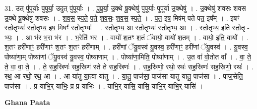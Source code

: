 \documentclass[17pt]{extarticle}
\begin{document}
31. उत् पु॑पूर्याः पुपूर्या॒ उदुत् पु॑पूर्याः । . पु॒पू॒र्या॒ उ॒क्थे षू॒क्थेषु॑ पुपूर्याः पुपूर्या उ॒क्थेषु॑ । . उ॒क्थेषु॑ शवसः शवस उ॒क्थे षू॒क्थेषु॑ शवसः । . श॒व॒स॒ स्प॒ते॒ प॒ते॒ श॒व॒सः॒ श॒व॒स॒ स्प॒ते॒ । . प॒त॒ इष॒ मिष॑म् पते पत॒ इष᳚म् । . इषꣳ॑ स्तो॒तृभ्यः॑ स्तो॒तृभ्य॒ इष॒ मिषꣳ॑ स्तो॒तृभ्यः॑ । . स्तो॒तृभ्य॒ आ स्तो॒तृभ्यः॑ स्तो॒तृभ्य॒ आ । . स्तो॒तृभ्य॒ इति॑ स्तो॒तृ - भ्यः॒ । . आ भ॑र भ॒रा भ॑र । . भ॒रेति॑ भर । . वायो॑ श॒तꣳ श॒तं ॅवायो॒ वायो॑ श॒तम् । . वायो॒ इति॒ वायो᳚ । . श॒तꣳ हरी॑णाꣳ॒॒ हरी॑णाꣳ श॒तꣳ श॒तꣳ हरी॑णाम् । . हरी॑णां ॅयु॒वस्व॑ यु॒वस्व॒ हरी॑णाꣳ॒॒ हरी॑णां ॅयु॒वस्व॑ । . यु॒वस्व॒ पोष्या॑णा॒म् पोष्या॑णां ॅयु॒वस्व॑ यु॒वस्व॒ पोष्या॑णाम् । . पोष्या॑णा॒मिति॒ पोष्या॑णाम् । . उ॒त वा॑ वो॒तोत वा᳚ । . वा॒ ते॒ ते॒ वा॒ वा॒ ते॒ । . ते॒ स॒ह॒स्रिणः॑ सह॒स्रिण॑ स्ते ते सह॒स्रिणः॑ । . स॒ह॒स्रिणो॒ रथो॒ रथः॑ सह॒स्रिणः॑ सह॒स्रिणो॒ रथः॑ । . रथ॒ आ रथो॒ रथ॒ आ । . आ या॑तु या॒त्वा या॑तु । . या॒तु॒ पाज॑सा॒ पाज॑सा यातु यातु॒ पाज॑सा । . पाज॒सेति॒ पाज॑सा । . प्र याभि॒र् याभिः॒ प्र प्र याभिः॑ । . याभि॒र् यासि॒ यासि॒ याभि॒र् याभि॒र् यासि॑ । \newline

\textbf{Ghana Paata } \newline
\end{document}
